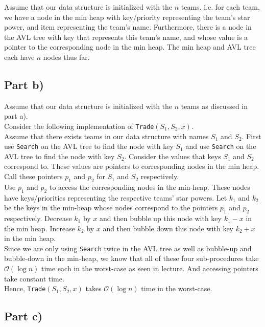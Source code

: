 \documentclass[12pt]{article}
\begin{document}
Assume that our data structure is initialized with the $n$ teams. i.e. for each team, we have a node in the min heap with key/priority representing the team's star power, and item representing the team's name. Furthermore, there is a node in the AVL tree with key that represents this team's name, and whose value is a pointer to the corresponding node in the min heap. The min heap and AVL tree each have $n$ nodes thus far. 

\subsection*{Part b)}

Assume that our data structure is initialized with the $n$ teams as discussed in part a). \\

Consider the following implementation of \verb|Trade|$(S_1, S_2, x)$. \\

Assume that there exists teams in our data structure with names $S_1$ and $S_2$. First use \verb|Search| on the AVL tree to find the node with key $S_1$ and use \verb|Search| on the AVL tree to find the node with key $S_2$. Consider the values that keys $S_1$ and $S_2$ correspond to. These values are pointers to corresponding nodes in the min heap. Call these pointers $p_1$ and $p_2$ for $S_1$ and $S_2$ respectively. \\

Use $p_1$ and $p_2$ to access the corresponding nodes in the min-heap. These nodes have keys/priorities representing the respective teams' star powers. Let $k_1$ and $k_2$ be the keys in the min-heap whose nodes correspond to the pointers $p_1$ and $p_2$ respectively. Decrease $k_1$ by $x$ and then bubble up this node with key $k_1-x$ in the min heap. Increase $k_2$ by $x$ and then bubble down this node with key $k_2+x$ in the min heap. \\

Since we are only using \verb|Search| twice in the AVL tree as well as bubble-up and bubble-down in the min-heap, we know that all of these four sub-procedures take $\mathcal{O}(\log n)$ time each in the worst-case as seen in lecture. And accessing pointers take constant time. \\

Hence, \verb|Trade|$(S_1, S_2, x)$ takes $\mathcal{O}(\log n)$ time in the worst-case. \\

\subsection*{Part c)}
\end{document}
